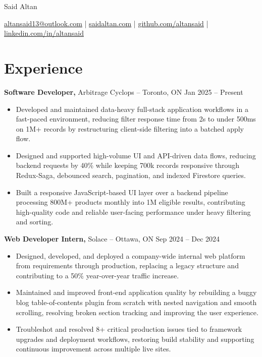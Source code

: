 \documentclass[11pt]{article}       %
\begin{document}
\centerline{\Huge Said Altan}

\vspace{10pt}

\centerline{\href{mailto:altansaid13@outlook.com}{altansaid13@outlook.com} | \href{https://saidaltan.com}{saidaltan.com} | \href{https://github.com/altansaid}{github.com/altansaid} | \href{https://www.linkedin.com/in/altansaid}{linkedin.com/in/altansaid}}


\vspace{5pt}
\section*{Experience}
\textbf{Software Developer,} {Arbitrage Cyclops} -- Toronto, ON \hfill Jan 2025 -- Present \\
\vspace{-9pt}
\begin{itemize}
  \item Developed and maintained data-heavy full-stack application workflows in a fast-paced environment, reducing filter response time from 2s to under 500ms on 1M+ records by restructuring client-side filtering into a batched apply flow.
  \item Designed and supported high-volume UI and API-driven data flows, reducing backend requests by 40\% while keeping 700k records responsive through Redux-Saga, debounced search, pagination, and indexed Firestore queries.
  \item Built a responsive JavaScript-based UI layer over a backend pipeline processing 800M+ products monthly into 1M eligible results, contributing high-quality code and reliable user-facing performance under heavy filtering and sorting.
\end{itemize}

\textbf{Web Developer Intern,} {Solace} -- Ottawa, ON \hfill Sep 2024 -- Dec 2024 \\
\vspace{-9pt}
\begin{itemize}
  \item Designed, developed, and deployed a company-wide internal web platform from requirements through production, replacing a legacy structure and contributing to a 50\% year-over-year traffic increase.
  \item Maintained and improved front-end application quality by rebuilding a buggy blog table-of-contents plugin from scratch with nested navigation and smooth scrolling, resolving broken section tracking and improving the user experience.
  \item Troubleshot and resolved 8+ critical production issues tied to framework upgrades and deployment workflows, restoring build stability and supporting continuous improvement across multiple live sites.
\end{itemize}
\end{document}
